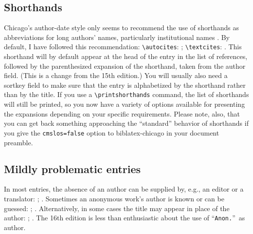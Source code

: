 \documentclass[a4paper,12pt]{report}
\newcommand{\cmd}[1]{\texttt{\textbackslash #1}}
\begin{document}
\subsection*{Shorthands}
\label{sec:shorthands}

Chicago's author-date style only seems to recommend the use of
shorthands as abbreviations for long authors' names, particularly
institutional names \autocite[15.36]{chicago:manual}.  By default, I
have followed this recommendation: \cmd{autocites}:
\autocites{bsi:abbreviation}{iso:electrodoc}; \cmd{textcites}:
\textcites{bsi:abbreviation}{iso:electrodoc}.  This \textsf{shorthand}
will by default appear at the head of the entry in the list of
references, followed by the parenthesized expansion of the shorthand,
taken from the \textsf{author} field.  (This is a change from the 15th
edition.)  You will usually also need a \textsf{sortkey} field to make
sure that the entry is alphabetized by the \textsf{shorthand} rather
than by the \textsf{title}.  If you use a \cmd{printshorthands}
command, the list of shorthands will still be printed, so you now have
a variety of options available for presenting the expansions depending
on your specific requirements.  Please note, also, that you can get
back something approaching the \enquote{standard} behavior of
shorthands if you give the \texttt{cmslos=false} option to
\textsf{biblatex-chicago} in your document preamble.

\subsection*{Mildly problematic entries}
\label{sec:problematic}

In most entries, the absence of an author can be supplied by, e.g., an
editor or a translator: \autocite{chaucer:alt};
\autocite{silver:gawain}.  Sometimes an anonymous work's author is
known or can be guessed: \autocite{horsley:prosodies};
\autocite{cook:sotweed}.  Alternatively, in some cases the
\textsf{title} may appear in place of the \textsf{author}:
\autocite{anon:stanze}; \autocite{virginia:plantation}.  The 16th
edition is less than enthusiastic about the use of
\enquote{\texttt{Anon.}}\ as author.
\end{document}
